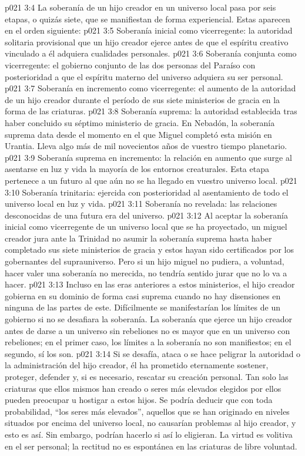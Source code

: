 \vs p021 3:4 \pc La soberanía de un hijo creador en un universo local pasa por seis etapas, o quizás siete, que se manifiestan de forma experiencial. Estas aparecen en el orden siguiente:
\vs p021 3:5 Soberanía inicial como vicerregente: la autoridad solitaria provisional que un hijo creador ejerce antes de que el espíritu creativo vinculado a él adquiera cualidades personales.
\vs p021 3:6 Soberanía conjunta como vicerregente: el gobierno conjunto de las dos personas del Paraíso con posterioridad a que el espíritu materno del universo adquiera su ser personal.
\vs p021 3:7 Soberanía en incremento como vicerregente: el aumento de la autoridad de un hijo creador durante el período de sus siete ministerios de gracia en la forma de las criaturas.
\vs p021 3:8 Soberanía suprema: la autoridad establecida tras haber concluido su séptimo ministerio de gracia. En Nebadón, la soberanía suprema data desde el momento en el que Miguel completó esta misión en Urantia. Lleva algo más de mil novecientos años de vuestro tiempo planetario.
\vs p021 3:9 Soberanía suprema en incremento: la relación en aumento que surge al asentarse en luz y vida la mayoría de los entornos creaturales. Esta etapa pertenece a un futuro al que aún no se ha llegado en vuestro universo local.
\vs p021 3:10 Soberanía trinitaria: ejercida con posterioridad al asentamiento de todo el universo local en luz y vida.
\vs p021 3:11 Soberanía no revelada: las relaciones desconocidas de una futura era del universo.
\vs p021 3:12 \pc Al aceptar la soberanía inicial como vicerregente de un universo local que se ha proyectado, un miguel creador jura ante la Trinidad no asumir la soberanía suprema hasta haber completado sus siete ministerios de gracia y estos hayan sido certificados por los gobernantes del suprauniverso. Pero si un hijo miguel no pudiera, a voluntad, hacer valer una soberanía no merecida, no tendría sentido jurar que no lo va a hacer.
\vs p021 3:13 Incluso en las eras anteriores a estos ministerios, el hijo creador gobierna en su dominio de forma casi suprema cuando no hay disensiones en ninguna de las partes de este. Difícilmente se manifestarían los límites de un gobierno si no se desafiara la soberanía. La soberanía que ejerce un hijo creador antes de darse a un universo sin rebeliones no es mayor que en un universo con rebeliones; en el primer caso, los límites a la soberanía no son manifiestos; en el segundo, sí los son.
\vs p021 3:14 Si se desafía, ataca o se hace peligrar la autoridad o la administración del hijo creador, él ha prometido eternamente sostener, proteger, defender y, si es necesario, rescatar su creación personal. Tan solo las criaturas que ellos mismos han creado o seres más elevados elegidos por ellos pueden preocupar u hostigar a estos hijos. Se podría deducir que con toda probabilidad, “los seres más elevados”, aquellos que se han originado en niveles situados por encima del universo local, no causarían problemas al hijo creador, y esto es así. Sin embargo, podrían hacerlo si así lo eligieran. La virtud es volitiva en el ser personal; la rectitud no es espontánea en las criaturas de libre voluntad.
